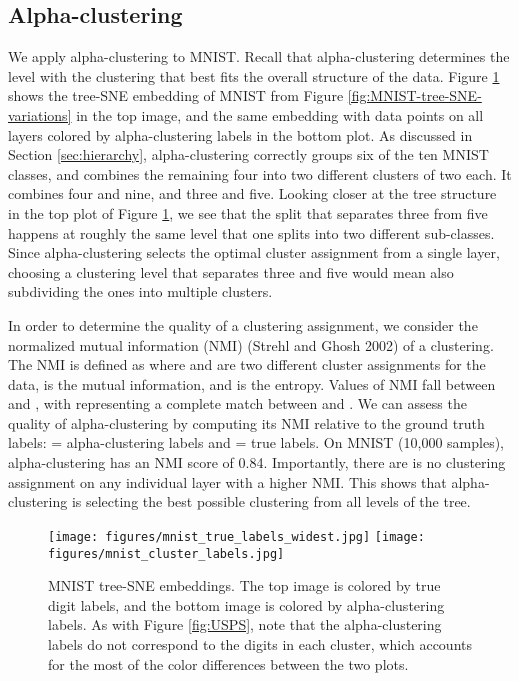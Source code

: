 \documentclass{article}
\begin{document}
\subsection{Alpha-clustering}

We apply alpha-clustering to MNIST. Recall that alpha-clustering determines the level with the clustering that best fits the overall structure of the data. Figure \ref{fig:MNIST-clusters} shows the tree-SNE embedding of MNIST from Figure \ref{fig:MNIST-tree-SNE-variations} in the top image, and the same embedding with data points on all layers colored by alpha-clustering labels in the bottom plot. As discussed in Section \ref{sec:hierarchy}, alpha-clustering correctly groups six of the ten MNIST classes, and combines the remaining four into two different clusters of two each. It combines four and nine, and three and five. Looking closer at the tree structure in the top plot of Figure \ref{fig:MNIST-clusters}, we see that the split that separates three from five happens at roughly the same level that one splits into two different sub-classes. Since alpha-clustering selects the optimal cluster assignment from a single layer, choosing a clustering level that separates three and five would mean also subdividing the ones into multiple clusters. 

In order to determine the quality of a clustering assignment, we consider the normalized mutual information (NMI) (Strehl and Ghosh 2002) of a clustering. The NMI is defined as  where  and  are two different cluster assignments for the data,  is the mutual information, and  is the entropy. Values of NMI fall between  and , with  representing a complete match between  and . We can assess the quality of alpha-clustering by computing its NMI relative to the ground truth labels:  = alpha-clustering labels and  = true labels. On MNIST (10,000 samples), alpha-clustering has an NMI score of 0.84. Importantly, there are is no clustering assignment on any individual layer with a higher NMI. This shows that alpha-clustering is selecting the best possible clustering from all levels of the tree. 

\begin{figure}[htp]
    \centering
    \captionsetup{width=.9\linewidth}
    \texttt{[image: figures/mnist\_true\_labels\_widest.jpg]}
    \texttt{[image: figures/mnist\_cluster\_labels.jpg]}
    \caption{MNIST tree-SNE embeddings. The top image is colored by true digit labels, and the bottom image is colored by alpha-clustering labels. As with Figure \ref{fig:USPS}, note that the alpha-clustering labels do not correspond to the digits in each cluster, which accounts for the most of the color differences between the two plots.}
    \label{fig:MNIST-clusters}
\end{figure}
\end{document}
